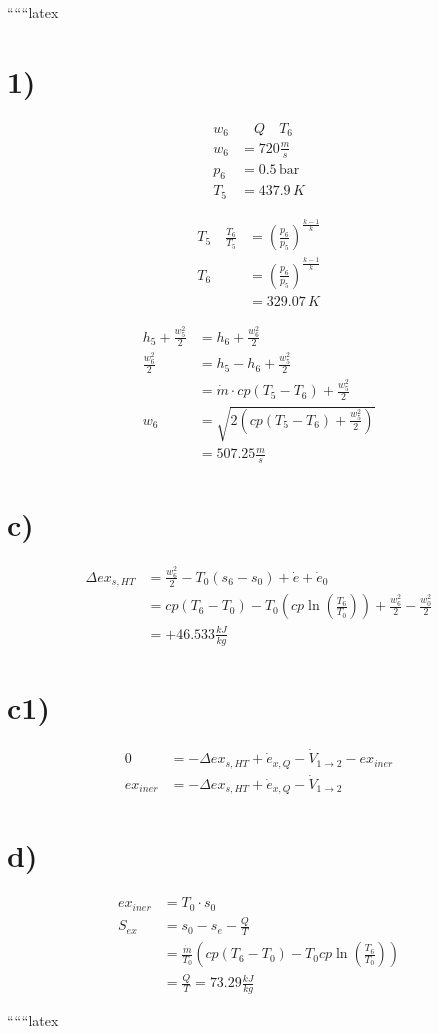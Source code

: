 ``````latex


\section*{1)}

\begin{align*}
w_6 & \quad Q \quad T_6 \\
w_6 &= 720 \frac{m}{s} \\
p_6 &= 0.5 \, \text{bar} \\
T_5 &= 437.9 \, K
\end{align*}

\begin{align*}
T_5 \quad \frac{T_6}{T_5} &= \left( \frac{p_6}{p_5} \right)^{\frac{k-1}{k}} \\
T_6 &= \left( \frac{p_6}{p_5} \right)^{\frac{k-1}{k}} \\
&= 329.07 \, K
\end{align*}

\begin{align*}
h_5 + \frac{w_5^2}{2} &= h_6 + \frac{w_6^2}{2} \\
\frac{w_6^2}{2} &= h_5 - h_6 + \frac{w_5^2}{2} \\
&= \dot{m} \cdot cp (T_5 - T_6) + \frac{w_5^2}{2} \\
w_6 &= \sqrt{2 \left( cp (T_5 - T_6) + \frac{w_5^2}{2} \right)} \\
&= 507.25 \frac{m}{s}
\end{align*}

\section*{c)}

\begin{align*}
\Delta ex_{s,HT} &= \frac{w_6^2}{2} - T_0 (s_6 - s_0) + \dot{e} + \dot{e}_0 \\
&= cp (T_6 - T_0) - T_0 \left( cp \ln \left( \frac{T_6}{T_0} \right) \right) + \frac{w_6^2}{2} - \frac{w_0^2}{2} \\
&= + 46.533 \frac{kJ}{kg}
\end{align*}

\section*{c1)}

\begin{align*}
0 &= -\Delta ex_{s,HT} + \dot{e}_{x,Q} - \dot{V}_{1 \rightarrow 2} - ex_{iner} \\
ex_{iner} &= -\Delta ex_{s,HT} + \dot{e}_{x,Q} - \dot{V}_{1 \rightarrow 2}
\end{align*}

\section*{d)}

\begin{align*}
ex_{iner} &= T_0 \cdot s_0 \\
S_{ex} &= s_0 - s_e - \frac{Q}{T} \\
&= \frac{\dot{m}}{T_0} \left( cp \left( T_6 - T_0 \right) - T_0 cp \ln \left( \frac{T_6}{T_0} \right) \right) \\
&= \frac{Q}{T} = 73.29 \frac{kJ}{kg}
\end{align*}

``````latex


